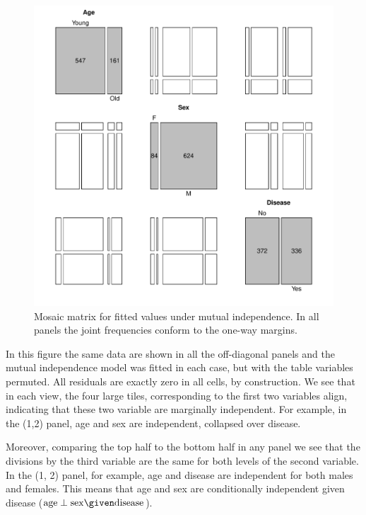 \documentclass[11pt]{book}
\renewenvironment{knitrout}{\small\renewcommand{\baselinestretch}{.85}}{} %
\begin{document}
\begin{knitrout}
\color{fgcolor}\begin{kframe}
\begin{alltt}
  \hlstd{=}\hlstd{)}
\end{alltt}
\end{kframe}\begin{figure}[!htb]


\centerline{\includegraphics[width=.8\textwidth]{ch05/fig/struc-mos3} }

\caption[Mosaic matrix for fitted values under mutual independence]{Mosaic matrix for fitted values under mutual independence.  In all panels the joint frequencies conform to the one-way margins.\label{fig:struc-mos3}}
\end{figure}


\end{knitrout}
In this figure the same data are shown in all the off-diagonal panels
and the mutual independence model was fitted in each case, but with the
table variables permuted.  All residuals are exactly zero in all cells,
by construction.
We see that in each view, the four large
tiles, corresponding to the first two variables align, indicating
that these two variable are marginally independent.
For example, in the (1,2) panel, age and sex are independent, collapsed
over disease.

Moreover, comparing the top half to the bottom half
in any panel we see that the divisions by the third variable
are the same for both levels of the second variable.
In the (1, 2) panel, for example, age and disease are independent 
for both males and females.
This means that age and sex are conditionally independent
given disease ($\mathrm{age} \perp \mathrm{sex} \given \mathrm{disease}$).
\end{document}
